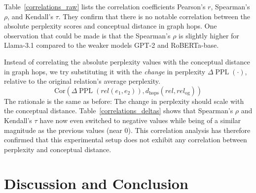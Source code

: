 \documentclass[11pt]{article}
\DeclareMathOperator{\PPL}{PPL}
\begin{document}
Table~\ref{correlations_raw} lists the correlation coefficients Pearson's $r$, Spearman's $\rho$, and Kendall's $\tau$. They confirm that there is no notable correlation between the absolute perplexity scores and conceptual distance in graph hops. One observation that could be made is that the Spearman's $\rho$ is slightly higher for Llama-3.1 compared to the weaker models GPT-2 and RoBERTa-base.

Instead of correlating the absolute perplexity values with the conceptual distance in graph hops, we try substituting it with the \emph{change} in perplexity $\Delta \PPL(\cdot)$, relative to the original relation's average perplexity.
\begin{equation}
  \text{Cor}\left(\Delta\PPL(\textit{rel}(e_1, e_2)), d_\text{hops}(\textit{rel}, \textit{rel}_\text{og}) \right)
\end{equation}
The rationale is the same as before: The change in perplexity should scale with the conceptual distance. Table~\ref{correlations_deltas} shows that Spearman's $\rho$ and Kendall's $\tau$ have now even switched to negative values while being of a similar magnitude as the previous values (near 0). 
This correlation analysis has therefore confirmed that this experimental setup does not exhibit any correlation between perplexity and conceptual distance.

\section{Discussion and Conclusion}
\end{document}
